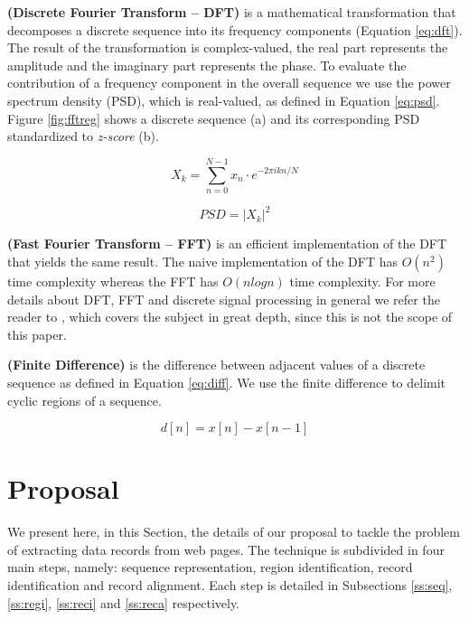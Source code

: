 \documentclass{vldb}
\begin{document}
\begin{definition}\textbf{(Discrete Fourier Transform -- DFT)} is a mathematical
transformation that decomposes a discrete sequence into its frequency components
(Equation \ref{eq:dft}). The result of the transformation is complex-valued, the
real part represents the amplitude and the imaginary part represents the phase.
To evaluate the contribution of a frequency component in the overall sequence we
use the power spectrum density (PSD), which is real-valued, as defined in
Equation \ref{eq:psd}.
Figure \ref{fig:fftreg} shows a discrete sequence (a) and its corresponding PSD
standardized to \textit{z-score} (b).

\begin{equation}\label{eq:dft}
    X_k=\sum_{n=0}^{N-1}{x_n\cdot e^{-2\pi ikn/N}}    
\end{equation}

\begin{equation}\label{eq:psd}
    PSD=|X_k|^2
\end{equation}

\end{definition}

\begin{definition}\textbf{(Fast Fourier Transform -- FFT)}\label{def:fft} is an
efficient implementation of the DFT that yields the same result. The naive implementation
of the DFT has $O(n^2)$ time complexity whereas the FFT has $O(nlogn)$ time
complexity. For more details about DFT, FFT and discrete signal
processing in general we refer the reader to \cite{oppenheim1989discrete},
which covers the subject in great depth, since this is not the scope of this
paper.
\end{definition}

\begin{definition}\textbf{(Finite Difference)}\label{def:diff} is the difference
between adjacent values of a discrete sequence as defined in Equation
\ref{eq:diff}.
We use the finite difference to delimit cyclic regions of a sequence.

\begin{equation}\label{eq:diff}
    d[n] = x[n] - x[n - 1]
\end{equation}
\end{definition}

\section{Proposal}\label{sec:prop}
We present here, in this Section, the details of our proposal to tackle the
problem of extracting data records from web pages. The technique is subdivided
in four main steps, namely: sequence representation, region identification,
record identification and record alignment. Each step is detailed in Subsections
\ref{ss:seq}, \ref{ss:regi}, \ref{ss:reci} and \ref{ss:reca} respectively.
\end{document}
